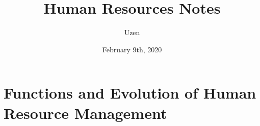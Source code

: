 \documentclass{report}
\title{Human Resources Notes}
\author{Uzen}
\date{February 9th, 2020}
\begin{document}
\maketitle
\newpage
\tableofcontents
\newpage

\chapter{Functions and Evolution of Human Resource Management}

\end{document}
